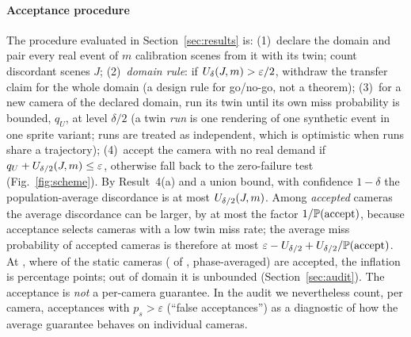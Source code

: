 

\paragraph{Acceptance procedure} The procedure evaluated in Section~\ref{sec:results} is: (1)~declare the domain and
pair every real event of $m$ calibration scenes from it with its twin; count discordant scenes $J$; (2)~\emph{domain rule}:
if $U_\delta(J,m)>\varepsilon/2$, withdraw the transfer claim for the whole domain (a design rule for go/no-go, not a
theorem); (3)~for a new camera of the declared domain, run its twin until its own miss probability is bounded, $q_U$, at
level $\delta/2$ (a twin \emph{run} is one rendering of one synthetic event in one sprite variant; runs are treated as
independent, which is optimistic when runs share a trajectory); (4)~accept the camera with no real demand if $q_U+U_{\delta/2}(J,m)\le\varepsilon$, otherwise fall
back to the zero-failure test (Fig.~\ref{fig:scheme}). By Result~4(a) and a union bound, with confidence $1-\delta$ the population-average discordance is at most
$U_{\delta/2}(J,m)$. Among \emph{accepted} cameras the average discordance can be larger, by at most the factor
$1/\mathbb{P}(\mathrm{accept})$, because acceptance selects cameras with a low twin miss rate; the average miss probability of
accepted cameras is therefore at most $\varepsilon-U_{\delta/2}+U_{\delta/2}/\mathbb{P}(\mathrm{accept})$. At \OPs{}, where
\nPAccept{} of the static cameras (\nSavedCamOP{} of \nMainScenes, phase-averaged) are accepted, the inflation is \nAcceptInflation{} percentage points; out of domain it is
unbounded (Section~\ref{sec:audit}). The acceptance is \emph{not} a per-camera guarantee. In the audit we nevertheless count, per camera, acceptances with $p_s>\varepsilon$ (``false acceptances'') as a
diagnostic of how the average guarantee behaves on individual cameras.

